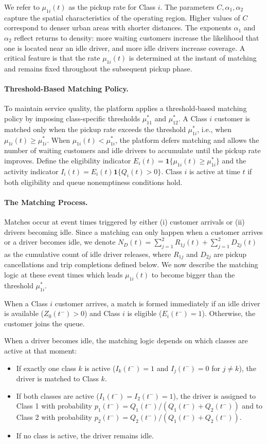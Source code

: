 We refer to $\mu_{1i}(t)$ as the pickup rate for Class $i$.
The parameters $C, \alpha_1, \alpha_2$ capture the spatial characteristics of the operating region.
Higher values of $C$ correspond to denser urban areas with shorter distances.
The exponents $\alpha_1$ and $\alpha_2$ reflect returns to density: more waiting customers increase the likelihood that one is located near an idle driver, and more idle drivers increase coverage.
A critical feature is that the rate $\mu_{1i}(t)$ is determined at the instant of matching and remains fixed throughout the subsequent pickup phase.

\paragraph{\bf Threshold-Based Matching Policy.}
To maintain service quality, the platform applies a threshold-based matching policy by imposing class-specific thresholds $\mu^*_{11}$ and $\mu^*_{12}$.
A Class $i$ customer is matched only when the pickup rate exceeds the threshold $\mu^*_{1i}$, i.e., when $\mu_{1i}(t) \geq \mu^*_{1i}$.
When $\mu_{1i}(t) < \mu^*_{1i}$, the platform defers matching and allows the number of waiting customers and idle drivers to accumulate until the pickup rate improves.
Define the eligibility indicator $E_i(t) = \mathbf{1}\{\mu_{1i}(t) \geq \mu^*_{1i}\}$ and the activity indicator $I_i(t) = E_i(t)\mathbf{1}\{Q_i(t)>0\}$.
Class $i$ is active at time $t$ if both eligibility and queue nonemptiness conditions hold.

\paragraph{\bf The Matching Process.}
Matches occur at event times triggered by either (i) customer arrivals or (ii) drivers becoming idle.
Since a matching can only happen when a customer arrives or a driver becomes idle, we denote $N_D(t) = \sum_{j=1}^2 R_{1j}(t) + \sum_{j=1}^2 D_{2j}(t)$ as the cumulative count of idle driver releases, where $R_{1j}$ and $D_{2j}$ are pickup cancellations and trip completions defined below.
We now describe the matching logic at these event times which leads $\mu_{1i}(t)$ to become bigger than the threshold $\mu^*_{1i}$.

When a Class $i$ customer arrives, a match is formed immediately if an idle driver is available ($Z_0(t^-) > 0$) and Class $i$ is eligible ($E_i(t^-) = 1$).
Otherwise, the customer joins the queue.

When a driver becomes idle, the matching logic depends on which classes are active at that moment:
\begin{itemize}
    \item If exactly one class $k$ is active ($I_k(t^-) = 1$ and $I_j(t^-) = 0$ for $j \neq k$), the driver is matched to Class $k$.
    \item If both classes are active ($I_1(t^-) = I_2(t^-) = 1$), the driver is assigned to Class 1 with probability $p_1(t^-) = Q_1(t^-)/(Q_1(t^-) + Q_2(t^-))$ and to Class 2 with probability $p_2(t^-) = Q_2(t^-)/(Q_1(t^-) + Q_2(t^-))$.
    \item If no class is active, the driver remains idle.
\end{itemize}

